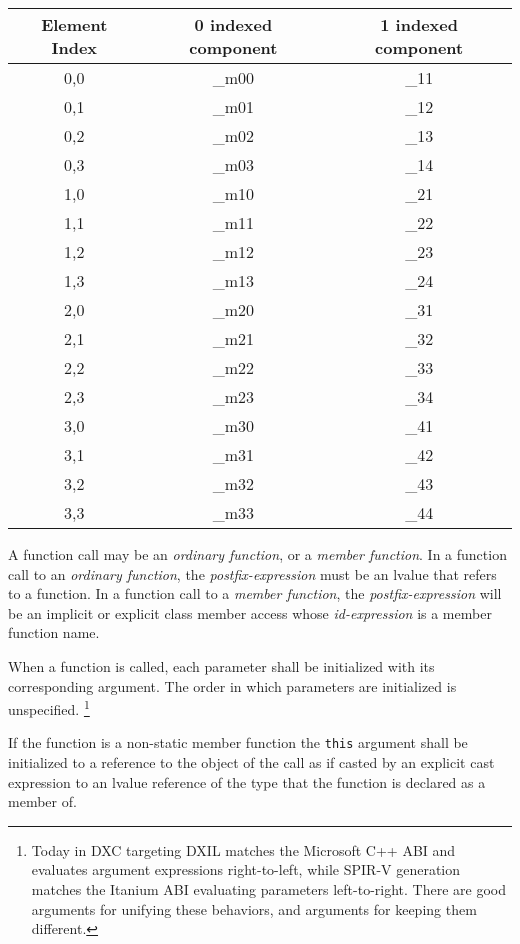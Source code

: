 \begin{center}
  \begin{tabular}{|| c | c | c ||}
    \hline
    Element Index & 0 indexed component & 1 indexed component \\
    \hline
    0,0 & \_m00 & \_11 \\
    0,1 & \_m01 & \_12 \\
    0,2 & \_m02 & \_13 \\
    0,3 & \_m03 & \_14 \\
    1,0 & \_m10 & \_21 \\
    1,1 & \_m11 & \_22 \\
    1,2 & \_m12 & \_23 \\
    1,3 & \_m13 & \_24 \\
    2,0 & \_m20 & \_31 \\
    2,1 & \_m21 & \_32 \\
    2,2 & \_m22 & \_33 \\
    2,3 & \_m23 & \_34 \\
    3,0 & \_m30 & \_41 \\
    3,1 & \_m31 & \_42 \\
    3,2 & \_m32 & \_43 \\
    3,3 & \_m33 & \_44 \\
    \hline
  \end{tabular}
\end{center}


\p A function call may be an \textit{ordinary function}, or a \textit{member
function}. In a function call to an \textit{ordinary function}, the
\textit{postfix-expression} must be an lvalue that refers to a function. In a
function call to a \textit{member function}, the \textit{postfix-expression}
will be an implicit or explicit class member access whose \textit{id-expression}
is a member function name.

\p When a function is called, each parameter shall be initialized with its
corresponding argument. The order in which parameters are initialized is
unspecified. \footnote{Today in DXC targeting DXIL matches the Microsoft C++ ABI
and evaluates argument expressions right-to-left, while SPIR-V generation
matches the Itanium ABI evaluating parameters left-to-right. There are good
arguments for unifying these behaviors, and arguments for keeping them
different.}

\p If the function is a non-static member function the \texttt{this} argument
shall be initialized to a reference to the object of the call as if casted by an
explicit cast expression to an lvalue reference of the type that the function is
declared as a member of.

